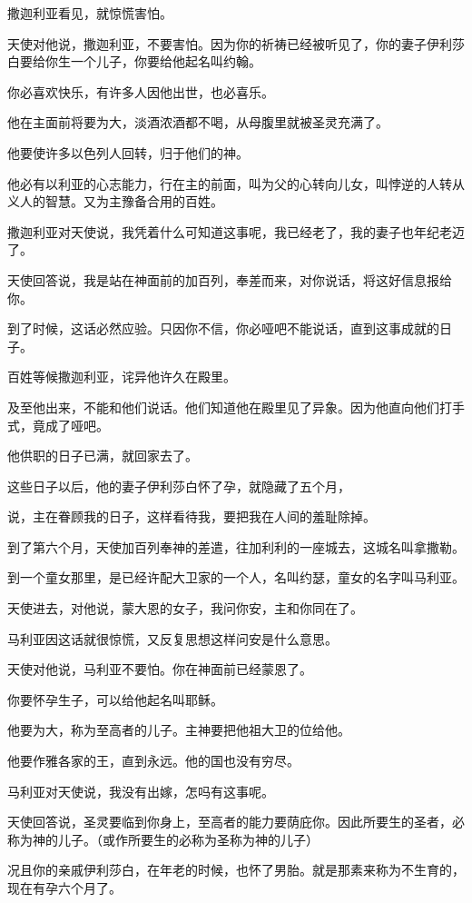 \documentclass[12pt,oneside]{book}
\begin{document}
撒迦利亚看见，就惊慌害怕。

天使对他说，撒迦利亚，不要害怕。因为你的祈祷已经被听见了，你的妻子伊利莎白要给你生一个儿子，你要给他起名叫约翰。

你必喜欢快乐，有许多人因他出世，也必喜乐。

他在主面前将要为大，淡酒浓酒都不喝，从母腹里就被圣灵充满了。

他要使许多以色列人回转，归于他们的神。

他必有以利亚的心志能力，行在主的前面，叫为父的心转向儿女，叫悖逆的人转从义人的智慧。又为主豫备合用的百姓。

撒迦利亚对天使说，我凭着什么可知道这事呢，我已经老了，我的妻子也年纪老迈了。

天使回答说，我是站在神面前的加百列，奉差而来，对你说话，将这好信息报给你。

到了时候，这话必然应验。只因你不信，你必哑吧不能说话，直到这事成就的日子。

百姓等候撒迦利亚，诧异他许久在殿里。

及至他出来，不能和他们说话。他们知道他在殿里见了异象。因为他直向他们打手式，竟成了哑吧。

他供职的日子已满，就回家去了。

这些日子以后，他的妻子伊利莎白怀了孕，就隐藏了五个月，

说，主在眷顾我的日子，这样看待我，要把我在人间的羞耻除掉。

到了第六个月，天使加百列奉神的差遣，往加利利的一座城去，这城名叫拿撒勒。

到一个童女那里，是已经许配大卫家的一个人，名叫约瑟，童女的名字叫马利亚。

天使进去，对他说，蒙大恩的女子，我问你安，主和你同在了。

马利亚因这话就很惊慌，又反复思想这样问安是什么意思。

天使对他说，马利亚不要怕。你在神面前已经蒙恩了。

你要怀孕生子，可以给他起名叫耶稣。

他要为大，称为至高者的儿子。主神要把他祖大卫的位给他。

他要作雅各家的王，直到永远。他的国也没有穷尽。

马利亚对天使说，我没有出嫁，怎吗有这事呢。

天使回答说，圣灵要临到你身上，至高者的能力要荫庇你。因此所要生的圣者，必称为神的儿子。（或作所要生的必称为圣称为神的儿子）

况且你的亲戚伊利莎白，在年老的时候，也怀了男胎。就是那素来称为不生育的，现在有孕六个月了。
\end{document}
